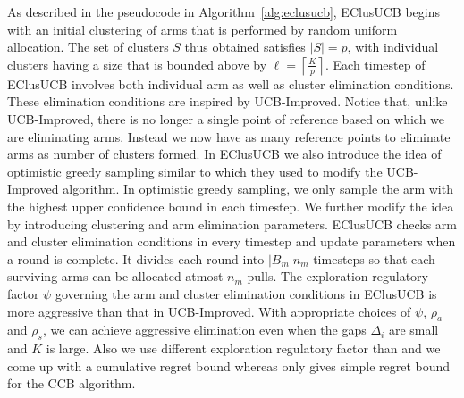 As described in the pseudocode in Algorithm~\ref{alg:eclusucb}, EClusUCB begins with an initial clustering of arms that is performed by random uniform allocation. The set of clusters $S$ thus obtained satisfies $|S|=p$, with individual clusters having a size that is bounded above by $\ell=\left\lceil \frac{K}{p} \right\rceil$.
Each timestep of EClusUCB involves both individual arm as well as cluster elimination conditions. These elimination conditions are inspired by UCB-Improved. Notice that, unlike UCB-Improved, there is no longer a single point of reference based on which we are eliminating arms. Instead we now have as many reference points to eliminate arms as number of clusters formed. 
In EClusUCB we also introduce the idea of optimistic greedy sampling similar to \citet{liu2016modification} which they used to modify the UCB-Improved algorithm. In optimistic greedy sampling, we only sample the arm with the highest upper confidence bound in each timestep. We further modify the idea by introducing clustering and arm elimination parameters. EClusUCB checks arm and cluster elimination conditions in every timestep and update parameters when a round is complete. It divides each round into $|B_{m}|n_{m}$ timesteps so that each surviving arms can be allocated atmost $n_{m}$ pulls. The exploration regulatory factor $\psi$ governing the arm and cluster elimination conditions in EClusUCB is more aggressive than that in UCB-Improved. With appropriate choices of $\psi$, $\rho_a$ and $\rho_s$, we can achieve aggressive elimination even when the gaps $\Delta_i$ are small and $K$ is large. Also we use different exploration regulatory factor than \citet{liu2016modification} and we come up with a cumulative regret bound whereas \citet{liu2016modification} only gives simple regret bound for the CCB algorithm. 



